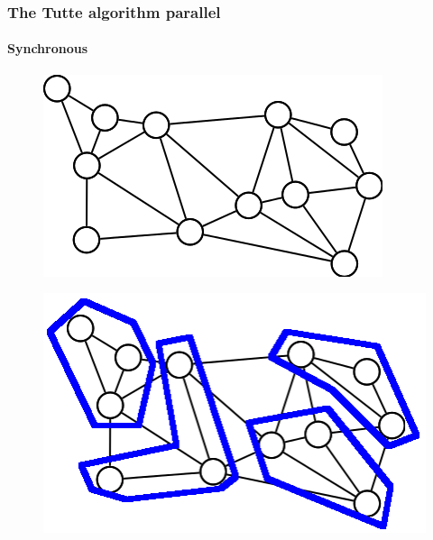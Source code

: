 \begin{frame}
\frametitle{The Tutte algorithm parallel}
\framesubtitle{Synchronous}
\begin{exampleblock}{}
\begin{figure}[!h]
\centering
\includegraphics[scale=0.4]{../rapport/img/g12.png}
\end{figure}
\end{exampleblock}{}
\pause
\begin{exampleblock}{}
\begin{figure}[!h]
\centering
\includegraphics[scale=0.4]{../rapport/img/g12_parted.png}
\end{figure}
\end{exampleblock}{}
\end{frame}
